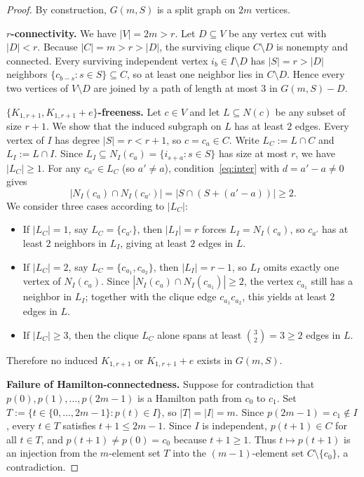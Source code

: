 \documentclass[11pt,a4paper]{article}
\begin{document}
\begin{proof}
By construction, $G(m,S)$ is a split graph on $2m$ vertices.

\medskip
\noindent\textbf{$r$-connectivity.}
We have $|V| = 2m > r$. Let $D \subseteq V$ be any vertex cut with $|D| < r$. Because $|C| = m > r > |D|$, the surviving clique $C \setminus D$ is nonempty and connected. Every surviving independent vertex $i_b \in I \setminus D$ has $|S| = r > |D|$ neighbors $\{c_{b-s} : s \in S\} \subseteq C$, so at least one neighbor lies in $C \setminus D$. Hence every two vertices of $V \setminus D$ are joined by a path of length at most $3$ in $G(m,S) - D$.

\medskip
\noindent\textbf{$\{K_{1,r+1}, K_{1,r+1}+e\}$-freeness.}
Let $c \in V$ and let $L \subseteq N(c)$ be any subset of size $r+1$. We show that the induced subgraph on $L$ has at least $2$ edges.
Every vertex of $I$ has degree $|S| = r < r+1$, so $c = c_a \in C$. Write $L_C := L \cap C$ and $L_I := L \cap I$. Since $L_I \subseteq N_I(c_a) = \{i_{s+a} : s \in S\}$ has size at most $r$, we have $|L_C| \ge 1$.
For any $c_{a'} \in L_C$ (so $a' \ne a$), condition~\eqref{eq:inter} with $d = a' - a \ne 0$ gives
\[
|N_I(c_a) \cap N_I(c_{a'})| = |S \cap (S + (a' - a))| \ge 2.
\]
We consider three cases according to $|L_C|$:
\begin{itemize}
\item If $|L_C| = 1$, say $L_C = \{c_{a'}\}$, then $|L_I| = r$ forces $L_I = N_I(c_a)$, so $c_{a'}$ has at least $2$ neighbors in $L_I$, giving at least $2$ edges in $L$.
\item If $|L_C| = 2$, say $L_C = \{c_{a_1}, c_{a_2}\}$, then $|L_I| = r - 1$, so $L_I$ omits exactly one vertex of $N_I(c_a)$. Since $|N_I(c_a) \cap N_I(c_{a_1})| \ge 2$, the vertex $c_{a_1}$ still has a neighbor in $L_I$; together with the clique edge $c_{a_1}c_{a_2}$, this yields at least $2$ edges in $L$.
\item If $|L_C| \ge 3$, then the clique $L_C$ alone spans at least $\binom{3}{2} = 3 \ge 2$ edges in $L$.
\end{itemize}
Therefore no induced $K_{1,r+1}$ or $K_{1,r+1}+e$ exists in $G(m,S)$.

\medskip
\noindent\textbf{Failure of Hamilton-connectedness.}
Suppose for contradiction that $p(0), p(1), \dots, p(2m-1)$ is a Hamilton path from $c_0$ to $c_1$. Set $T := \{t \in \{0,\dots,2m-1\} : p(t) \in I\}$, so $|T| = |I| = m$. Since $p(2m-1) = c_1 \notin I$, every $t \in T$ satisfies $t + 1 \le 2m - 1$. Since $I$ is independent, $p(t+1) \in C$ for all $t \in T$, and $p(t+1) \ne p(0) = c_0$ because $t + 1 \ge 1$. Thus $t \mapsto p(t+1)$ is an injection from the $m$-element set $T$ into the $(m-1)$-element set $C \setminus \{c_0\}$, a contradiction.
\end{proof}
\end{document}
